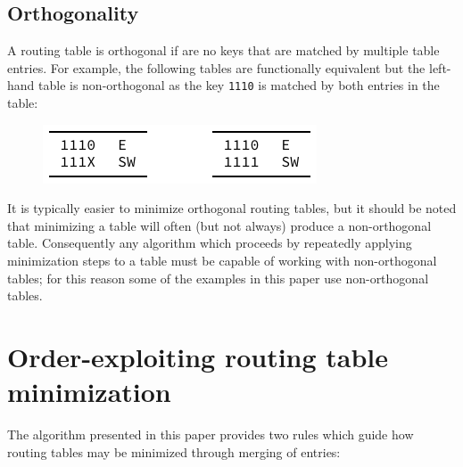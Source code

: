 \documentclass[conference]{IEEEtran}
\newcommand{\mytt}[1]{\texttt{\footnotesize#1}}
\begin{document}
  \subsection{Orthogonality}

  A routing table is orthogonal if are no keys that are matched by multiple table entries.
  For example, the following tables are functionally equivalent but the left-hand table is non-orthogonal as the key \mytt{1110} is matched by both entries in the table:

  \begin{figure}[H]
    \centering
    \includegraphics{figures/orthogonality}
  \end{figure}

  It is typically easier to minimize orthogonal routing tables, but it should be noted that minimizing a table will often (but not always) produce a non-orthogonal table.
  Consequently any algorithm which proceeds by repeatedly applying minimization steps to a table must be capable of working with non-orthogonal tables; for this reason some of the examples in this paper use non-orthogonal tables.

  \section{Order-exploiting routing table minimization}

  The algorithm presented in this paper provides two rules which guide how routing tables may be minimized through merging of entries:
\end{document}
